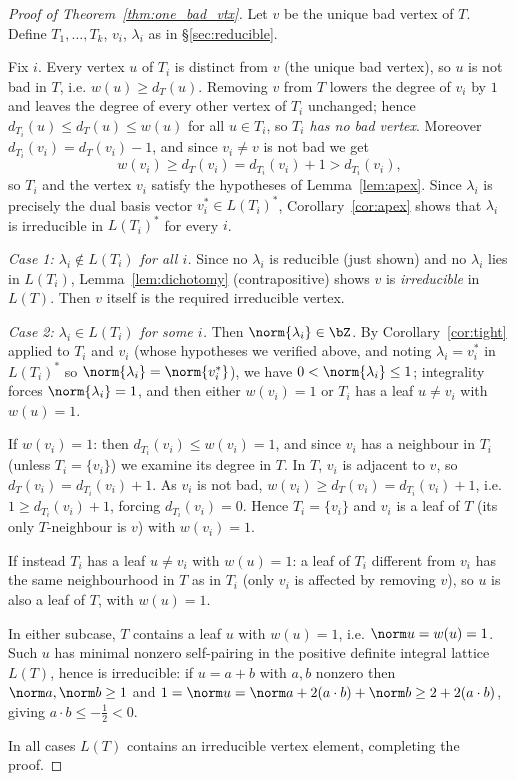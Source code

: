 \begin{proof}[Proof of Theorem~\ref{thm:one_bad_vtx}]
Let $v$ be the unique bad vertex of $T$.  Define $T_1,\dots,T_k$, $v_i$, $\lambda_i$ as in
\S\ref{sec:reducible}.

Fix $i$.  Every vertex $u$ of $T_i$ is distinct from $v$ (the unique bad vertex), so $u$ is
not bad in $T$, i.e. $w(u)\ge d_T(u)$.  Removing $v$ from $T$ lowers the degree of $v_i$ by
$1$ and leaves the degree of every other vertex of $T_i$ unchanged; hence
$d_{T_i}(u)\le d_T(u)\le w(u)$ for all $u\in T_i$, so \emph{$T_i$ has no bad vertex}.
Moreover $d_{T_i}(v_i)=d_T(v_i)-1$, and since $v_i\ne v$ is not bad we get
\[
w(v_i)\ge d_T(v_i)=d_{T_i}(v_i)+1>d_{T_i}(v_i),
\]
so $T_i$ and the vertex $v_i$ satisfy the hypotheses of Lemma~\ref{lem:apex}.  Since
$\lambda_i$ is precisely the dual basis vector $v_i^\ast\in L(T_i)^\ast$,
Corollary~\ref{cor:apex} shows that $\lambda_i$ is irreducible in $L(T_i)^\ast$ for every
$i$.

\emph{Case 1: $\lambda_i\notin L(T_i)$ for all $i$.}  Since no $\lambda_i$ is reducible (just
shown) and no $\lambda_i$ lies in $L(T_i)$, Lemma~\ref{lem:dichotomy} (contrapositive) shows
$v$ is \emph{irreducible} in $L(T)$.  Then $v$ itself is the required irreducible vertex.

\emph{Case 2: $\lambda_i\in L(T_i)$ for some $i$.}  Then $\norm{\lambda_i}\in\bZ$.  By
Corollary~\ref{cor:tight} applied to $T_i$ and $v_i$ (whose hypotheses we verified above, and
noting $\lambda_i=v_i^\ast$ in $L(T_i)^\ast$ so $\norm{\lambda_i}=\norm{v_i^\ast}$), we have
$0<\norm{\lambda_i}\le1$; integrality forces $\norm{\lambda_i}=1$, and then either
$w(v_i)=1$ or $T_i$ has a leaf $u\ne v_i$ with $w(u)=1$.

If $w(v_i)=1$: then $d_{T_i}(v_i)\le w(v_i)=1$, and since $v_i$ has a neighbour in $T_i$
(unless $T_i=\{v_i\}$) we examine its degree in $T$.  In $T$, $v_i$ is adjacent to $v$, so
$d_T(v_i)=d_{T_i}(v_i)+1$.  As $v_i$ is not bad, $w(v_i)\ge d_T(v_i)=d_{T_i}(v_i)+1$, i.e.
$1\ge d_{T_i}(v_i)+1$, forcing $d_{T_i}(v_i)=0$.  Hence $T_i=\{v_i\}$ and $v_i$ is a leaf of
$T$ (its only $T$-neighbour is $v$) with $w(v_i)=1$.

If instead $T_i$ has a leaf $u\ne v_i$ with $w(u)=1$: a leaf of $T_i$ different from $v_i$ has
the same neighbourhood in $T$ as in $T_i$ (only $v_i$ is affected by removing $v$), so $u$ is
also a leaf of $T$, with $w(u)=1$.

In either subcase, $T$ contains a leaf $u$ with $w(u)=1$, i.e. $\norm u=w(u)=1$.  Such $u$ has
minimal nonzero self-pairing in the positive definite integral lattice $L(T)$, hence is
irreducible: if $u=a+b$ with $a,b$ nonzero then $\norm a,\norm b\ge1$ and
$1=\norm u=\norm a+2(a\cdot b)+\norm b\ge2+2(a\cdot b)$, giving $a\cdot b\le-\tfrac12<0$.

In all cases $L(T)$ contains an irreducible vertex element, completing the proof.
\end{proof}

